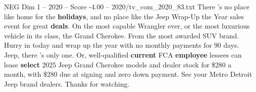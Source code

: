 \begin{textsample}{NEG Dim 1 – 2020 – Score -4.00 – 2020/tv\_com\_2020\_83.txt}  \label{ex:f1_neg_001}
There 's no place like home for the \textbf{holidays}, and no place like the Jeep Wrap-Up the Year sales event for great \textbf{deals}.
On the most capable Wrangler ever, or the most luxurious vehicle in its class, the Grand Cherokee.
From the most awarded SUV brand.
Hurry in today and wrap up the year with no monthly payments for 90 days.
Jeep, there 's only one.
Or, well-qualified \textbf{current} FCA \textbf{employee} lessees can lease \textbf{select} 2025 Jeep Grand Cherokee models and dealer stock for \$280 a month, with \$280 due at signing and zero down payment.
See your Metro Detroit Jeep brand dealers.
Thanks for watching.

\end{textsample}
